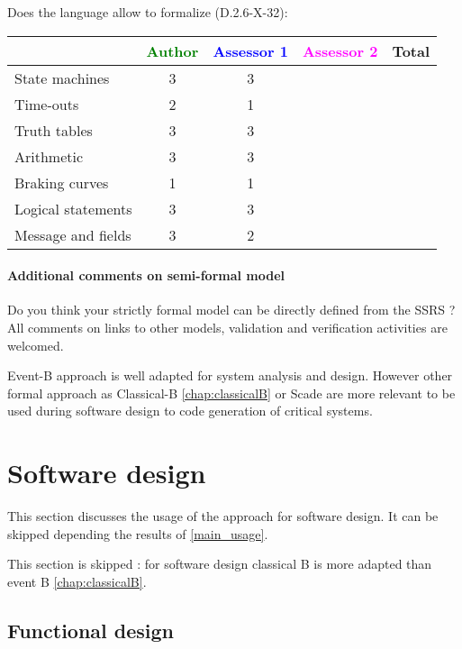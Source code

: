Does the language allow to  formalize (D.2.6-X-32):

\begin{tabular}{|l | c | c | c | c|}
\hline
& \textcolor{green}{Author} & \textcolor{blue}{Assessor 1} & \textcolor{magenta}{Assessor 2} & Total \\
\hline 
State machines  & 3 & 3 & &  \\
\hline
Time-outs  & 2 & 1 & &  \\
\hline
Truth tables  & 3 & 3 & &  \\
\hline
Arithmetic  & 3 & 3 & &  \\
\hline
Braking curves  & 1 & 1 & &  \\
\hline
Logical statements & 3 & 3 & &  \\
\hline
Message and fields & 3 & 2 & &  \\
\hline
\end{tabular}

\paragraph{Additional comments on semi-formal  model} Do you think your strictly formal  model can be directly defined from the SSRS ?
All comments on links to  other models, validation and verification activities are welcomed.


\begin{author_comment}
Event-B  approach is well adapted for system analysis and design. However other formal approach as Classical-B \ref{chap:classicalB} or Scade are more relevant to be used during software design to code generation of critical systems.
\end{author_comment}


\section{Software design}
This section discusses the usage of the approach for software design.
It can be skipped depending the results of \ref{main_usage}.


\begin{author_comment}
This section is skipped :  for software design classical B is more adapted than event B \ref{chap:classicalB}.
\end{author_comment}


\subsection{Functional design}


